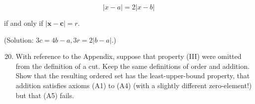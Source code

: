 \documentclass[10pt]{article}
\begin{document}
$$
|x-a|=2|x-b|
$$

if and only if $|\mathbf{x}-\mathbf{c}|=r$.

(Solution: $3 c=4 b-a, 3 r=2|b-a|$.)

\begin{enumerate}
  \setcounter{enumi}{19}
  \item With reference to the Appendix, suppose that property (III) were omitted from the definition of a cut. Keep the same definitions of order and addition. Show that the resulting ordered set has the least-upper-bound property, that addition satisfies axioms (A1) to (A4) (with a slightly different zero-element!) but that (A5) fails.
\end{enumerate}
\end{document}
